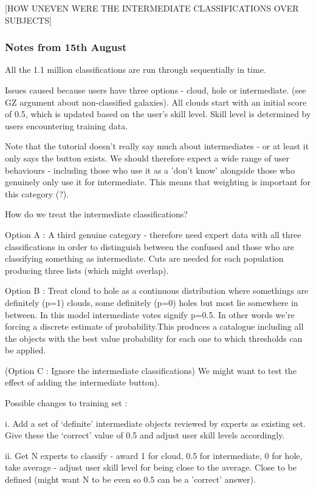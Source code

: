 \documentclass[a4,useAMS,usenatbib]{mn2e}
\begin{document}
[HOW UNEVEN WERE THE INTERMEDIATE CLASSIFICATIONS OVER SUBJECTS]




\subsubsection{Notes from 15th August}

All the 1.1 million classifications are run through sequentially in time.

Issues caused because users have three options - cloud, hole or intermediate. (see GZ argument about non-classified galaxies). All clouds start with an initial score of 0.5, which is updated based on the user's skill level. Skill level is determined by users encountering training data. 

Note that the tutorial doesn't really say much about intermediates - or at least it only says the button exists. We should therefore expect a wide range of user behaviours - including those who use it as a 'don't know' alongside those who genuinely only use it for intermediate. This means that weighting is important for this category (?). 

How do we treat the intermediate classifications? 

	Option A : A third genuine category - therefore need expert data with all three classifications in order to distinguish between the confused and those who are classifying something as intermediate. Cuts are needed for each population producing three lists (which might overlap). 
	
	Option B : Treat cloud to hole as a continuous distribution where somethings are definitely (p=1) clouds, some definitely (p=0) holes but most lie somewhere in between. In this model intermediate votes signify p=0.5. In other words we're forcing a discrete estimate of probability.This produces a catalogue including all the objects with the best value probability for each one to which thresholds can be applied. 
	
	(Option C : Ignore the intermediate classifications) We might want to test the effect of adding the intermediate button). 
	
	Possible changes to training set :
	
		i. Add a set of `definite' intermediate objects reviewed by experts as existing set. Give these the `correct' value of 0.5 and adjust user skill levels accordingly.
		
		ii. Get N experts to classify - award 1 for cloud, 0.5 for intermediate, 0 for hole, take average - adjust user skill level for being close to the average. Close to be defined (might want N to be even so 0.5 can be a 'correct' answer). 
		
\end{document}
